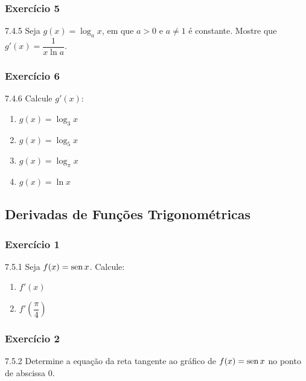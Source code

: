 \subsubsection*{Exercício 5}
\begin{exercicio}[5]{7.4.5}
Seja $g(x) = \log_a x$, em que $a > 0$ e $a \neq 1$ é constante. Mostre que $g'(x) = \dfrac{1}{x \ln a}$.
\end{exercicio}

\subsubsection*{Exercício 6}
\begin{exercicio}[6]{7.4.6}
Calcule $g'(x)$:
\begin{enumerate}[label=\alph*)]
    \item $g(x) = \log_3 x$
    \item $g(x) = \log_5 x$
    \item $g(x) = \log_\pi x$
    \item $g(x) = \ln x$
\end{enumerate}
\end{exercicio}

\clearpage

\subsection{Derivadas de Funções Trigonométricas}

\subsubsection*{Exercício 1}
\begin{exercicio}[1]{7.5.1}
Seja $f(x) = \operatorname{sen} x$. Calcule:
\begin{enumerate}[label=\alph*)]
    \item $f'(x)$
    \item $f'\!\left(\dfrac{\pi}{4}\right)$
\end{enumerate}
\end{exercicio}

\subsubsection*{Exercício 2}
\begin{exercicio}[2]{7.5.2}
Determine a equação da reta tangente ao gráfico de $f(x) = \operatorname{sen} x$ no ponto de abscissa 0.
\end{exercicio}

